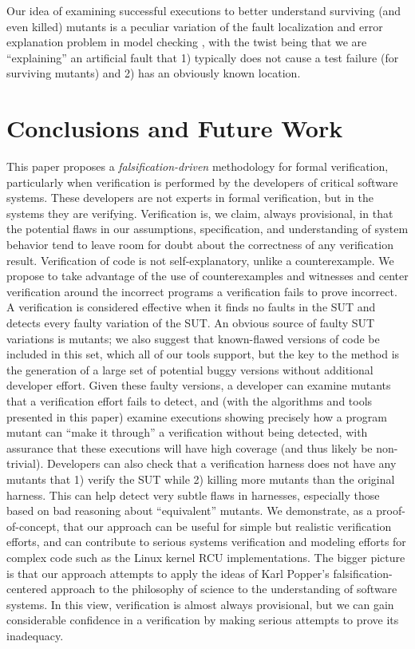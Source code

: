 \documentclass{svjour3}
\begin{document}
Our idea of examining successful executions to better understand
surviving (and even killed) mutants is a peculiar variation of the
fault localization and error explanation problem in model checking
\cite{GroceDist}, with the twist being that we are ``explaining'' an
artificial fault that 1) typically does not cause a test failure (for
surviving mutants) and 2) has an obviously known location.

\section{Conclusions and Future Work}

This paper proposes a \emph{falsification-driven} methodology for
formal verification, particularly when verification is performed by
the developers of critical software systems.  These developers are not
experts in formal verification, but in the systems they are verifying.
Verification is, we claim, always provisional, in that the potential
flaws in our assumptions, specification, and understanding of system
behavior tend to leave room for doubt about the correctness of any
verification result.  Verification of code is not self-explanatory,
unlike a counterexample.  We propose to take advantage of the use of
counterexamples and witnesses and center verification around the
incorrect programs a verification fails to prove incorrect.  A
verification is considered effective when it finds no faults in the
SUT and detects every faulty variation of the SUT.  An
obvious source of faulty SUT variations is mutants; we also suggest that
known-flawed versions of code be included in this set, which all of
our tools support, but the key to the method is the generation of a
large set of potential buggy versions without additional developer effort.  Given
these faulty versions, a developer can examine mutants that a verification
effort fails to detect, and (with the algorithms and tools presented
in this paper) examine executions showing precisely how a program
mutant can ``make it through'' a verification without being detected,
with assurance that these executions will have high coverage (and thus
likely be non-trivial).  Developers can also check that a verification
harness does not have any mutants that 1) verify the SUT while 2) killing
more mutants than the original harness.  This can help detect
very subtle flaws in harnesses, especially those based on bad
reasoning about ``equivalent'' mutants.  We demonstrate, as a
proof-of-concept, that our approach can be useful for simple but
realistic verification efforts, and can contribute to serious systems
verification and modeling efforts for complex code such as the Linux
kernel RCU implementations.  The bigger picture is that our approach
attempts to apply the ideas of Karl Popper's falsification-centered
approach to the philosophy of science to the understanding of software
systems.  In this view, verification is almost always provisional, but we can 
gain considerable confidence in a verification by making serious attempts to prove its inadequacy.
\end{document}
